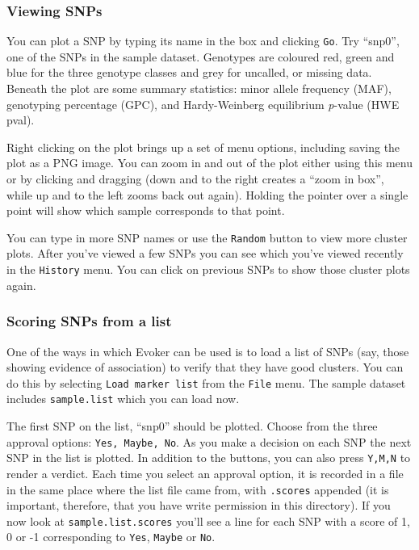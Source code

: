 \documentclass{article}
\begin{document}
\subsubsection{Viewing SNPs}
You can plot a SNP by typing its name in the box and clicking \texttt{Go}. Try ``snp0'', one of the SNPs in the sample dataset. Genotypes are coloured red, green and blue for the three genotype classes and grey for uncalled, or missing data. Beneath the plot are some summary statistics: minor allele frequency (MAF), genotyping percentage (GPC), and Hardy-Weinberg equilibrium \emph{p}-value (HWE pval).

Right clicking on the plot brings up a set of menu options, including saving the plot as a PNG image. You can zoom in and out of the plot either using this menu or by clicking and dragging (down and to the right creates a ``zoom in box'', while up and to the left zooms back out again). Holding the pointer over a single point will show which sample corresponds to that point.

You can type in more SNP names or use the \texttt{Random} button to view more cluster plots. After you've viewed a few SNPs you can see which you've viewed recently in the \texttt{History} menu. You can click on previous SNPs to show those cluster plots again.

\subsubsection{Scoring SNPs from a list}

One of the ways in which Evoker can be used is to load a list of SNPs (say, those showing evidence of association) to verify that they have good clusters. You can do this by selecting \texttt{Load marker list} from the \texttt{File} menu. The sample dataset includes \texttt{sample.list} which you can load now.

The first SNP on the list, ``snp0'' should be plotted. Choose from the three approval options: \texttt{Yes, Maybe, No}. As you make a decision on each SNP the next SNP in the list is plotted. In addition to the buttons, you can also press \texttt{Y,M,N} to render a verdict. Each time you select an approval option, it is recorded in a file in the same place where the list file came from, with \texttt{.scores} appended (it is important, therefore, that you have write permission in this directory). If you now look at \texttt{sample.list.scores} you'll see a line for each SNP with a score of 1, 0 or -1 corresponding to \texttt{Yes}, \texttt{Maybe} or \texttt{No}. 
\end{document}
